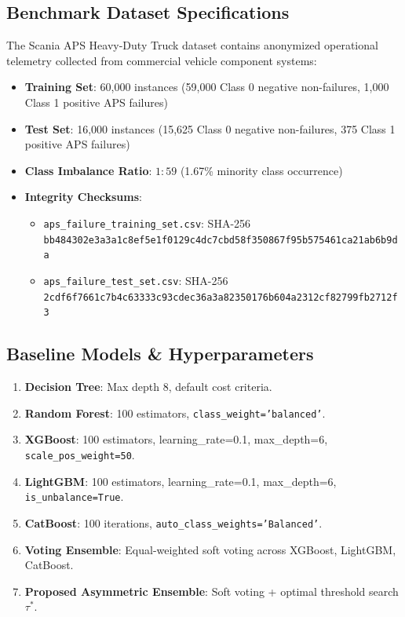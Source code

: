 \documentclass[journal]{IEEEtran}
\begin{document}
\subsection{Benchmark Dataset Specifications}
The Scania APS Heavy-Duty Truck dataset contains anonymized operational telemetry collected from commercial vehicle component systems:
\begin{itemize}
    \item \textbf{Training Set}: 60,000 instances (59,000 Class 0 negative non-failures, 1,000 Class 1 positive APS failures)
    \item \textbf{Test Set}: 16,000 instances (15,625 Class 0 negative non-failures, 375 Class 1 positive APS failures)
    \item \textbf{Class Imbalance Ratio}: $1:59$ (1.67\% minority class occurrence)
    \item \textbf{Integrity Checksums}:
    \begin{itemize}
        \item \texttt{aps\_failure\_training\_set.csv}: SHA-256 \texttt{bb484302e3a3a1c8ef5e1f0129c4dc7cbd58f350867f95b575461ca21ab6b9da}
        \item \texttt{aps\_failure\_test\_set.csv}: SHA-256 \texttt{2cdf6f7661c7b4c63333c93cdec36a3a82350176b604a2312cf82799fb2712f3}
    \end{itemize}
\end{itemize}

\subsection{Baseline Models \& Hyperparameters}
\begin{enumerate}
    \item \textbf{Decision Tree}: Max depth 8, default cost criteria.
    \item \textbf{Random Forest}: 100 estimators, \texttt{class\_weight='balanced'}.
    \item \textbf{XGBoost}: 100 estimators, learning\_rate=0.1, max\_depth=6, \texttt{scale\_pos\_weight=50}.
    \item \textbf{LightGBM}: 100 estimators, learning\_rate=0.1, max\_depth=6, \texttt{is\_unbalance=True}.
    \item \textbf{CatBoost}: 100 iterations, \texttt{auto\_class\_weights='Balanced'}.
    \item \textbf{Voting Ensemble}: Equal-weighted soft voting across XGBoost, LightGBM, CatBoost.
    \item \textbf{Proposed Asymmetric Ensemble}: Soft voting + optimal threshold search $\tau^*$.
\end{enumerate}
\end{document}
